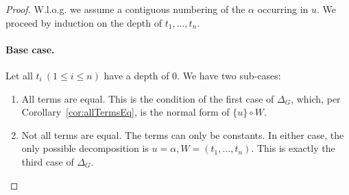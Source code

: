 \documentclass[a4paper, 11pt]{report}
\begin{document}
\begin{proof}
  W.l.o.g. we assume a contiguous numbering of the $\alpha$ occurring in $u$.
  We proceed by induction on the depth of $t_1,\dots,t_n$.

  \paragraph{Base case.} Let all $t_i\ (1 \leq i \leq n)$ have a depth of 0. We have two sub-cases:
  \begin{enumerate}
    \item All terms are equal. This is the condition of the first case of $\Delta_G$, which, per Corollary~\ref{cor:allTermsEq}, is the normal form of $\{u\} \circ W$.
    \item Not all terms are equal. The terms can only be constants. In either case, the only possible decomposition is $u=\alpha, W=(t_1,\dots,t_n)$. This is exactly the third case of $\Delta_G$.
  \end{enumerate}


\end{proof}
\end{document}
